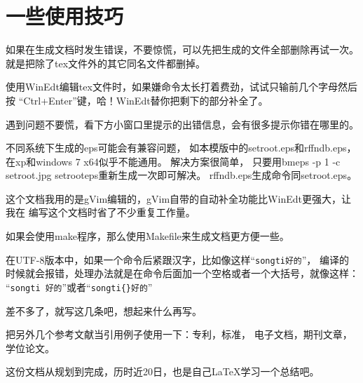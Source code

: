 \chapter{一些使用技巧}

如果在生成文档时发生错误，不要惊慌，可以先把生成的文件全部删除再试一次。
就是把除了tex文件外的其它同名文件都删掉。

使用WinEdt编辑tex文件时，如果嫌命令太长打着费劲，试试只输前几个字母然后按
“Ctrl+Enter”键，哈！WinEdt替你把剩下的部分补全了。

遇到问题不要慌，看下方小窗口里提示的出错信息，会有很多提示你错在哪里的。

不同系统下生成的eps可能会有兼容问题，
如本模版中的setroot.eps和rffndb.eps，在xp和windows 7 x64似乎不能通用。
解决方案很简单，
只要用bmeps -p 1 -c setroot.jpg setrooteps重新生成一次即可解决。
rffndb.eps生成命令同setroot.eps。

这个文档我用的是gVim编辑的，gVim自带的自动补全功能比WinEdt更强大，让我在
编写这个文档时省了不少重复工作量。

如果会使用make程序，那么使用Makefile来生成文档更方便一些。

在UTF-8版本中，如果一个命令后紧跟汉字，比如像这样“\verb+songti好的+”，
编译的时候就会报错，处理办法就是在命令后面加一个空格或者一个大括号，就像这样：
“\verb+songti 好的+”或者“\verb+songti{}好的+”

差不多了，就写这几条吧，想起来什么再写。

把另外几个参考文献当引用例子使用一下：专利\cite{WangZL}，标准\cite{WangStd}，
电子文档\cite{ZLB:1997}，期刊文章\cite{LUOZ:2007}，
学位论文\cite{wang:2008,wangmt:2008}。

这份文档从规划到完成，历时近20日，也是自己\LaTeX 学习一个总结吧。
